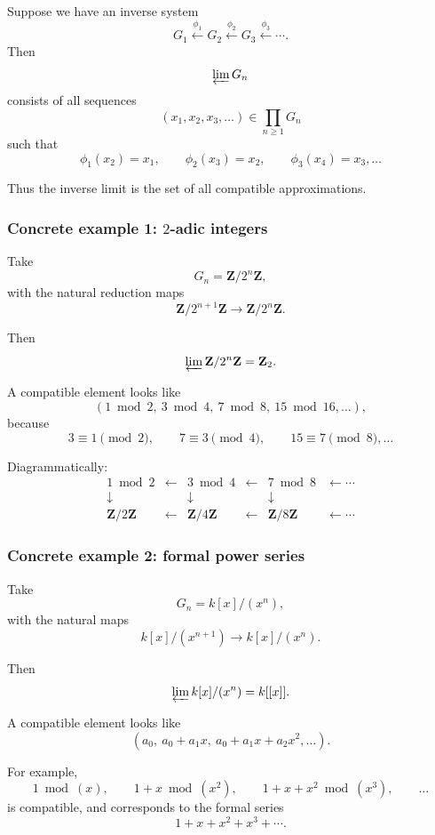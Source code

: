 \documentclass[12pt,a4paper]{article}
\theoremstyle{plain}
\theoremstyle{definition}      %
\begin{document}
	Suppose we have an inverse system
	\[
	G_1 \xleftarrow{\phi_1} G_2 \xleftarrow{\phi_2} G_3 \xleftarrow{\phi_3}\cdots.
	\]
	Then
	\[
	\varprojlim G_n
	\]
	consists of all sequences
	\[
	(x_1,x_2,x_3,\dots)\in \prod_{n\ge1} G_n
	\]
	such that
	\[
	\phi_1(x_2)=x_1,\qquad
	\phi_2(x_3)=x_2,\qquad
	\phi_3(x_4)=x_3,\dots
	\]
	
	Thus the inverse limit is the set of all compatible approximations.
	
	\subsubsection*{Concrete example 1: \(2\)-adic integers}
	
	Take
	\[
	G_n=\mathbf Z/2^n\mathbf Z,
	\]
	with the natural reduction maps
	\[
	\mathbf Z/2^{n+1}\mathbf Z \to \mathbf Z/2^n\mathbf Z.
	\]
	
	Then
	\[
	\varprojlim \mathbf Z/2^n\mathbf Z = \mathbf Z_2.
	\]
	
	A compatible element looks like
	\[
	(1 \bmod 2,\ 3 \bmod 4,\ 7 \bmod 8,\ 15 \bmod 16,\dots),
	\]
	because
	\[
	3\equiv 1 \pmod 2,\qquad
	7\equiv 3 \pmod 4,\qquad
	15\equiv 7 \pmod 8,\dots
	\]
	
	Diagrammatically:
	\[
	\begin{array}{cccccc}
		1 \bmod 2 & \leftarrow & 3 \bmod 4 & \leftarrow & 7 \bmod 8 & \leftarrow \cdots \\
		\downarrow & & \downarrow & & \downarrow \\
		\mathbf Z/2\mathbf Z & \xleftarrow{} & \mathbf Z/4\mathbf Z & \xleftarrow{} & \mathbf Z/8\mathbf Z & \xleftarrow{}\cdots
	\end{array}
	\]
	
	\subsubsection*{Concrete example 2: formal power series}
	
	Take
	\[
	G_n=k[x]/(x^n),
	\]
	with the natural maps
	\[
	k[x]/(x^{n+1}) \to k[x]/(x^n).
	\]
	
	Then
	\[
	\varprojlim k[x]/(x^n)=k[[x]].
	\]
	
	A compatible element looks like
	\[
	(a_0,\ a_0+a_1x,\ a_0+a_1x+a_2x^2,\dots).
	\]
	
	For example,
	\[
	1 \bmod (x),\qquad
	1+x \bmod (x^2),\qquad
	1+x+x^2 \bmod (x^3),\qquad \dots
	\]
	is compatible, and corresponds to the formal series
	\[
	1+x+x^2+x^3+\cdots.
	\]
	
\end{document}
